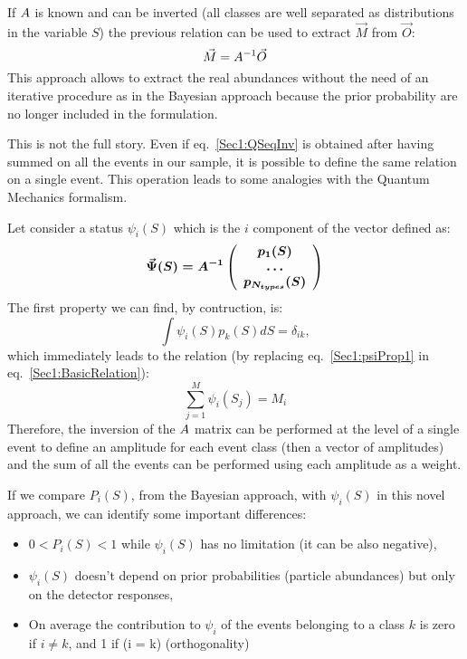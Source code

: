 If $\boldmath{A}$ is known and can be inverted (all classes are
well separated as distributions in the variable $S$) the previous relation can
be used to extract $\vec{M}$ from $\vec{O}$:
\begin{equation}
\label{Sec1:QSeqInv}
\vec{M} = \boldmath{A^{-1}} \vec{O}
\end{equation}
This approach allows to extract the real abundances without the need of
an iterative procedure as in the Bayesian approach because the prior
probability are no longer included in the formulation.

This is not the full story. Even if eq.~\ref{Sec1:QSeqInv} is
obtained after having summed on all the events in our sample, it is possible
to define the same relation on a single event. This operation leads to some
analogies with the Quantum Mechanics formalism.

Let consider a status $\psi_{i}(S)$ which is the $i$ component of the vector
defined as:
\begin{equation}
\label{Sec1:psi}
\vec{\Psi}(S) = \boldmath{A^{-1}} 
\left(
\begin{array}{c}
p_{1}(S)\\
\ldots \\
p_{N_{types}}(S)
\end{array}
\right)
\end{equation}
The first property we can find, by contruction, is:
\begin{equation}
\label{Sec1:psiProp1}
\int \psi_{i}(S) p_{k}(S) dS = \delta_{ik},
\end{equation}
which immediately leads to the relation (by replacing eq.~\ref{Sec1:psiProp1} in eq.~\ref{Sec1:BasicRelation}):
\begin{equation}
\label{Sec1:psi}
\sum\limits_{j=1}^{M}\psi_{i}(S_j) = M_{i}
\end{equation}
Therefore, the inversion of the $\boldmath{A}$ matrix can be performed at the
level of a single event to define an amplitude for each event class (then a
vector of amplitudes) and the sum of all the events can be performed using
each amplitude as a weight.

If we compare $P_{i}(S)$, from the Bayesian approach, with $\psi_{i}(S)$ in
this novel approach, we can identify some important differences:
\begin{itemize}
\item $0 < P_{i}(S) < 1$ while $\psi_{i}(S)$ has no limitation (it can be also
  negative),\\
\item $\psi_{i}(S)$ doesn't depend on prior probabilities (particle
  abundances) but only on the detector responses,\\
\item On average the contribution to
  $\psi_{i}$ of the events belonging to a class $k$ is zero if $i \neq k$, and
  1 if (i = k) (orthogonality)
\end{itemize}

